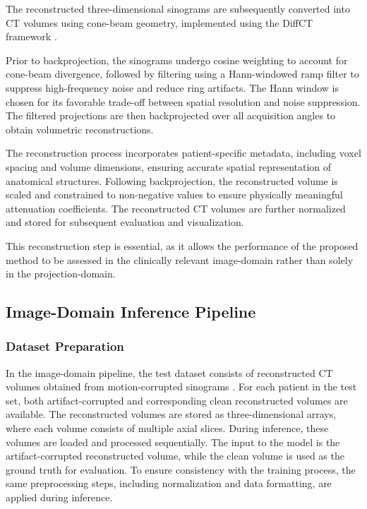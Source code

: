 The reconstructed three-dimensional sinograms are subsequently converted into CT volumes using cone-beam geometry, implemented using the DiffCT framework \cite{diffct2025}.

Prior to backprojection, the sinograms undergo cosine weighting to account for cone-beam divergence, followed by filtering using a Hann-windowed ramp filter to suppress high-frequency noise and reduce ring artifacts. The Hann window is chosen for its favorable trade-off between spatial resolution and noise suppression.  The filtered projections are then backprojected over all acquisition angles to obtain volumetric reconstructions. 

The reconstruction process incorporates patient-specific metadata, including voxel spacing and volume dimensions, ensuring accurate spatial representation of anatomical structures. 
Following backprojection, the reconstructed volume is scaled and constrained to non-negative values to ensure physically meaningful attenuation coefficients.
The reconstructed CT volumes are further normalized and stored for subsequent evaluation and visualization.


This reconstruction step is essential, as it allows the performance of the proposed method to be assessed in the clinically relevant image-domain rather than solely in the projection-domain.

\subsection{Image-Domain Inference Pipeline}
\subsubsection{Dataset Preparation}
In the image-domain pipeline, the test dataset consists of reconstructed CT volumes obtained from motion-corrupted sinograms \cite{diffct2025}. For each patient in the test set, both artifact-corrupted and corresponding clean reconstructed volumes are available.
The reconstructed volumes are stored as three-dimensional arrays, where each volume consists of multiple axial slices. During inference, these volumes are loaded and processed sequentially. The input to the model is the artifact-corrupted reconstructed volume, while the clean volume is used as the ground truth for evaluation.
To ensure consistency with the training process, the same preprocessing steps, including normalization and data formatting, are applied during inference.

